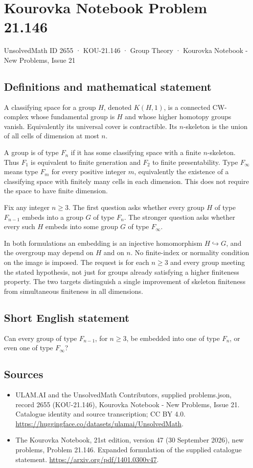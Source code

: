 \documentclass[11pt,a4paper]{article}
\begin{document}
\section*{Kourovka Notebook Problem 21.146}\label{2655}
{\small UnsolvedMath ID 2655 · KOU-21.146 · Group Theory · Kourovka Notebook - New Problems, Issue 21}
\subsection{Definitions and mathematical statement}
A classifying space for a group $H$, denoted $K(H,1)$, is a connected CW-complex whose fundamental group is $H$ and whose higher homotopy groups vanish. Equivalently its universal cover is contractible. Its $n$-skeleton is the union of all cells of dimension at most $n$.

A group is of type $F_n$ if it has some classifying space with a finite $n$-skeleton. Thus $F_1$ is equivalent to finite generation and $F_2$ to finite presentability. Type $F_\infty$ means type $F_m$ for every positive integer $m$, equivalently the existence of a classifying space with finitely many cells in each dimension. This does not require the space to have finite dimension.

Fix any integer $n\ge3$. The first question asks whether every group $H$ of type $F_{n-1}$ embeds into a group $G$ of type $F_n$. The stronger question asks whether every such $H$ embeds into some group $G$ of type $F_\infty$.

In both formulations an embedding is an injective homomorphism $H\hookrightarrow G$, and the overgroup may depend on $H$ and on $n$. No finite-index or normality condition on the image is imposed. The request is for each $n\ge3$ and every group meeting the stated hypothesis, not just for groups already satisfying a higher finiteness property. The two targets distinguish a single improvement of skeleton finiteness from simultaneous finiteness in all dimensions.
\subsection{Short English statement}
Can every group of type $F_{n-1}$, for $n\ge3$, be embedded into one of type $F_n$, or even one of type $F_\infty$?
\subsection{Sources}
\begin{itemize}
\item[S1] ULAM.AI and the UnsolvedMath Contributors, supplied problems.json, record 2655 (KOU-21.146), Kourovka Notebook - New Problems, Issue 21. Catalogue identity and source transcription; CC BY 4.0.
\url{https://huggingface.co/datasets/ulamai/UnsolvedMath}.
\item[S2] The Kourovka Notebook, 21st edition, version 47 (30 September 2026), new problems, Problem 21.146. Expanded formulation of the supplied catalogue statement.
\url{https://arxiv.org/pdf/1401.0300v47}.
\end{itemize}
\end{document}
